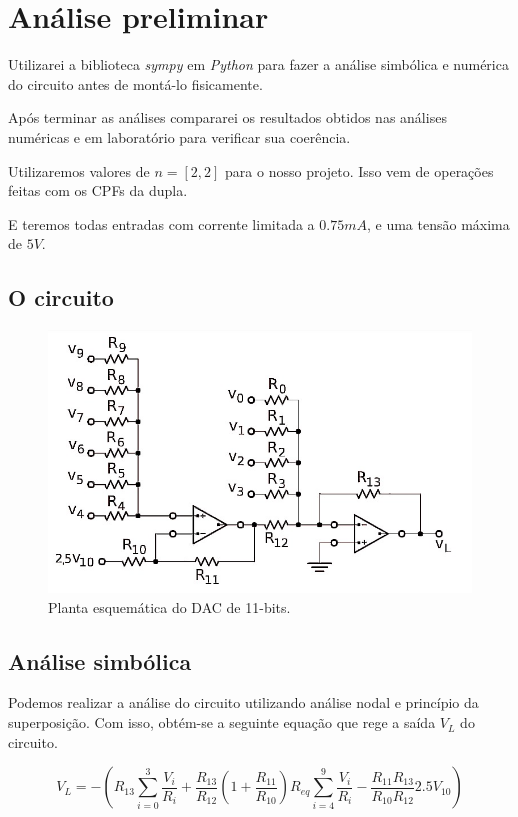 \section{Análise preliminar}

Utilizarei a biblioteca \emph{sympy} em \emph{Python} para fazer a análise simbólica e numérica do circuito antes de montá-lo fisicamente.

Após terminar as análises compararei os resultados obtidos nas análises numéricas e em laboratório para verificar sua coerência.

Utilizaremos valores de $n = [2,2]$ para o nosso projeto. Isso vem de operações feitas com os CPFs da dupla.

E teremos todas entradas com corrente limitada a $0.75mA$, e uma tensão máxima de $5V$.

\subsection{O circuito}

\begin{figure}[h]
    \centering
    \includegraphics[width=0.6\columnwidth]{images/circuito.jpeg}
    \caption{Planta esquemática do DAC de 11-bits.}
\end{figure}


\newpage
\subsection{Análise simbólica}

Podemos realizar a análise do circuito utilizando análise nodal e princípio da superposição. Com isso, obtém-se a seguinte equação que rege a saída $V_L$ do circuito.


\begin{equation}
    \label{eq:VL}
    V_L = - \left( R_{13} \sum_{i=0}^{3} \frac{V_i}{R_i} + \frac{R_{13}}{R_{12}} \left( 1 + \frac{R_{11}}{R_{10} }\right)  R_{eq} \sum_{i=4}^{9} \frac{V_i}{R_i}- \frac{R_{11}R_{13}}{R_{10} R_{12}} 2.5 V_{10} \right)
\end{equation}

